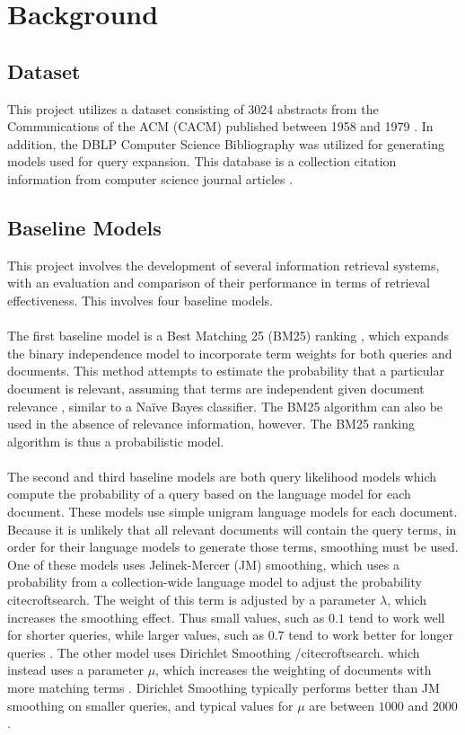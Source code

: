 \documentclass[conference]{IEEEtran}
\begin{document}
\section{Background}
\subsection{Dataset}
This project utilizes a dataset consisting of 3024 abstracts from the Communications of the ACM (CACM) published between 1958 and 1979 \cite{croftsearch}. In addition, the DBLP Computer Science Bibliography was utilized for generating models used for query expansion. This database is a collection citation information from computer science journal articles \cite{ley2002dblp}.
\subsection{Baseline Models}
This project involves the development of several information retrieval systems, with an evaluation and comparison of their performance in terms of retrieval effectiveness. This involves four baseline models.
\\\\
The first baseline model is a Best Matching 25 (BM25) ranking \cite{robertson1995okapi}, which expands the binary independence model to incorporate term weights for both queries and documents. This method attempts to estimate the probability that a particular document is relevant, assuming that terms are independent given document relevance \cite{yu1975precision}, similar to a Na\"ive Bayes classifier. The BM25 algorithm can also be used in the absence of relevance information, however. The BM25 ranking algorithm is thus a probabilistic model.
\\\\
The second and third baseline models are both query likelihood models which compute the probability of a query based on the language model for each document. These models use simple unigram language models for each document. Because it is unlikely that all relevant documents will contain the query terms, in order for their language models to generate those terms, smoothing must be used. One of these models uses Jelinek-Mercer (JM) smoothing, which uses a probability from a collection-wide language model to adjust the probability cite{croftsearch}. The weight of this term is adjusted by a parameter $\lambda$, which increases the smoothing effect. Thus small values, such as $0.1$ tend to work well for shorter queries, while larger values, such as $0.7$ tend to work better for longer queries \cite{croftsearch}. The other model uses Dirichlet Smoothing /cite{croftsearch}. which instead uses a parameter $\mu$, which increases the weighting of documents with more matching terms \cite{croftsearch}. Dirichlet Smoothing typically performs better than JM smoothing on smaller queries, and typical values for $\mu$ are between $1000$ and $2000$.
\end{document}
